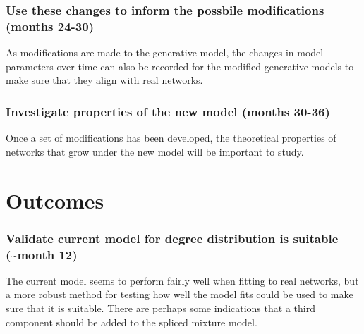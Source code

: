 \documentclass[
  10pt,
  a4paper,
]{scrreprt}
\theoremstyle{plain}
\theoremstyle{definition}
\theoremstyle{plain}
\theoremstyle{remark}
\begin{document}
{\hypertarget{use-these-changes-to-inform-the-possbile-modifications-months-24-30}{%
\subsubsection*{Use these changes to inform the possbile modifications
(months
24-30)}\label{use-these-changes-to-inform-the-possbile-modifications-months-24-30}}

As modifications are made to the generative model, the changes in model
parameters over time can also be recorded for the modified generative
models to make sure that they align with real networks.

\hypertarget{investigate-properties-of-the-new-model-months-30-36}{%
\subsubsection*{Investigate properties of the new model (months
30-36)}\label{investigate-properties-of-the-new-model-months-30-36}}

Once a set of modifications has been developed, the theoretical
properties of networks that grow under the new model will be important
to study.

\hypertarget{outcomes}{%
\section{Outcomes}\label{outcomes}}

\hypertarget{validate-current-model-for-degree-distribution-is-suitable-month-12}{%
\subsubsection*{Validate current model for degree distribution is
suitable (\textasciitilde month
12)}\label{validate-current-model-for-degree-distribution-is-suitable-month-12}}

The current model seems to perform fairly well when fitting to real
networks, but a more robust method for testing how well the model fits
could be used to make sure that it is suitable. There are perhaps some
indications that a third component should be added to the spliced
mixture model.

}
\end{document}
